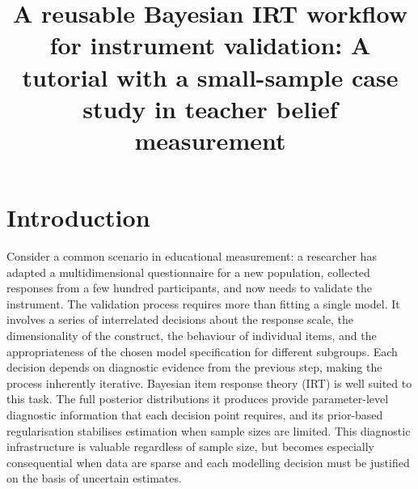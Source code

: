 \documentclass[
  man,
  floatsintext,
  longtable,
  nolmodern,
  notxfonts,
  notimes,
  colorlinks=true,linkcolor=blue,citecolor=blue,urlcolor=blue]{apa7}
\title{A reusable Bayesian IRT workflow for instrument validation: A
tutorial with a small-sample case study in teacher belief measurement}
\newlength{\cslhangindent}
\begin{document}
\maketitle




\setlength\LTleft{0pt}



\ifdefined\Shaded\renewenvironment{Shaded}{\begin{snugshade}\begin{singlespace}}{\end{singlespace}\end{snugshade}}\fi

\setlength{\cslhangindent}{0.5in}

\section{Introduction}\label{introduction}

Consider a common scenario in educational measurement: a researcher has
adapted a multidimensional questionnaire for a new population, collected
responses from a few hundred participants, and now needs to validate the
instrument. The validation process requires more than fitting a single
model. It involves a series of interrelated decisions about the response
scale, the dimensionality of the construct, the behaviour of individual
items, and the appropriateness of the chosen model specification for
different subgroups. Each decision depends on diagnostic evidence from
the previous step, making the process inherently iterative. Bayesian
item response theory (IRT) is well suited to this task. The full
posterior distributions it produces provide parameter-level diagnostic
information that each decision point requires, and its prior-based
regularisation stabilises estimation when sample sizes are limited. This
diagnostic infrastructure is valuable regardless of sample size, but
becomes especially consequential when data are sparse and each modelling
decision must be justified on the basis of uncertain estimates.
\end{document}
